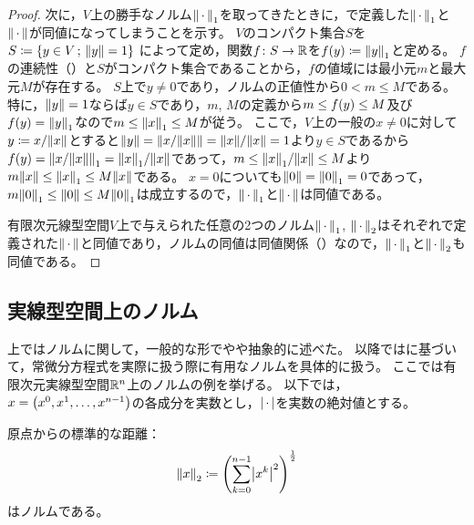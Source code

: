 \documentclass[b5paper,draft]{ltjsbook}
\begin{document}
\begin{thm}[有限次元線型空間上のノルムの同値性]
\begin{proof}
        次に，$V$上の勝手なノルム$\norm{\dummy}_1$を取ってきたときに，で定義した$\norm{\dummy}_1$と$\norm{\dummy}$が同値になってしまうことを示す。
        $V$のコンパクト集合$S$を$S\coloneqq \sset{y\in V}{\norm{y}=1}$
        によって定め，関数$f\colon S\to \mathbb{R}$を$\fun{f}{y}\coloneqq \norm{y}_1$と定める。
        $f$の連続性（）と$S$がコンパクト集合であることから，$f$の値域には最小元$m$と最大元$M$が存在する。
        $S$上で$y\ne {0}$であり，ノルムの正値性から$0<m\leq M$である。
        特に，$\norm{y}=1$ならば$y\in S$であり，$m$, $M$の定義から$m\leq \fun{f}{y}\leq M$及び$\fun{f}{y}=\norm{y}_1$なので$m\leq \norm{x}_1\leq M$が従う。
        ここで，$V$上の一般の$x\ne 0$に対して$y\coloneqq x / \norm{x}$とすると$\norm{y}=\norm{x/\norm{x}}=\norm{x}/\norm{x}=1$より$y\in S$であるから$\fun{f}{y}=\norm{x/\norm{x}}_1=\norm{x}_1/\norm{x}$であって，$m\leq \norm{x}_1/\norm{x}\leq M$より$m\norm{x}\leq \norm{x}_1\leq M\norm{x}$である。
        $x=0$についても$\norm{0}=\norm{0}_1=0$であって，$m \norm{0}_1\leq \norm{0}\leq M\norm{0}_1$は成立するので，$\norm{\dummy}_1$と$\norm{\dummy}$は同値である。

        有限次元線型空間$V$上で与えられた任意の2つのノルム$\norm{\dummy}_1$, $\norm{\dummy}_2$はそれぞれで定義された$\norm{\dummy}$と同値であり，ノルムの同値は同値関係（）なので，$\norm{\dummy}_1$と$\norm{\dummy}_2$も同値である。
    \end{proof}
\end{thm}


\subsection{実線型空間上のノルム}
上ではノルムに関して，一般的な形でやや抽象的に述べた。
以降では\cite{takano}に基づいて，常微分方程式を実際に扱う際に有用なノルムを具体的に扱う。
ここでは有限次元実線型空間$\mathbb{R}^n$上のノルムの例を挙げる。
以下では，$x=\pare{x^0,x^1,\dots,x^{n-1}}$の各成分を実数とし，$\abs{\dummy}$を実数の絶対値とする。

\begin{eg}[Euclidノルム]
    原点からの標準的な距離：
    \begin{equation}
        \norm{x}_2\coloneqq \pare{\sum_{k=0}^{n-1} \abs{x^k}^2}^{\frac{1}{2}}
    \end{equation}
    はノルムである。
\end{eg}
\end{document}

